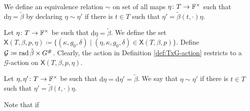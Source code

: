 We define an equivalence relation $\sim$ on set of all maps $\eta \colon T \to \mathbb{F}^\times$ such that $\mathrm{d} \eta = \tilde \beta$ by declaring  $\eta \sim \eta'$ if there is $t\in T$ such that $\eta' = \tilde\beta (t, \cdot) \eta$. 

Let $\eta \colon T \to \mathbb{F}^\times$ be such that $\mathrm{d} \eta = \tilde \beta$. 
We define the set $\mathsf{X}(T, \beta, p, \eta) \coloneqq \{ (\kappa, g_0, \delta) \mid (\eta, \kappa, g_0, \delta) \in \mathsf{X}(T, \beta, p)\}$. 
Define $\mathcal{G} \coloneqq \operatorname{rad} \tilde\beta \times G^\#$. 
Clearly, the action in Definition \ref{def:TxG-action} restricts to a $\mathcal{G}$-action on $\mathsf{X}(T, \beta, p, \eta)$.

\begin{defi}
    Let $\eta, \eta' \colon T \to \mathbb{F}^\times$ be such that $\mathrm{d} \eta = \mathrm{d} \eta' = \tilde \beta$. 
    We say that $\eta \sim \eta'$ if there is $t\in T$ such that $\eta' = \tilde\beta (t, \cdot) \eta$.
\end{defi}

Note that if 